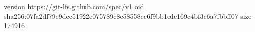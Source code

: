 version https://git-lfs.github.com/spec/v1
oid sha256:07fa2df79e9dcc51922e075789c8c58558cc6f9bb1edc169c4bf3c6a7fbbff07
size 174916
